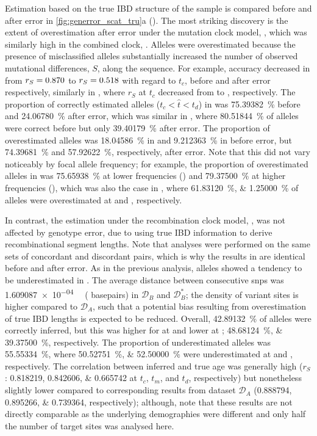 Estimation based on the true IBD structure of the sample is compared before and after error in \cref{fig:generror_scat_tru}{a} ().
The most striking discovery is the extent of overestimation after error under the mutation clock model, \ClockM, which was similarly high in the combined clock, \ClockC.
Alleles were overestimated because the presence of misclassified alleles substantially increased the number of observed mutational differences, $S$, along the sequence.
For example, accuracy decreased in \ClockM from ${r_S = \dec{0.869553}}$ to ${r_S = \dec{0.517705}}$ with regard to $t_c$, before and after error respectively, similarly in \ClockC, where $r_S$ at $t_c$ decreased from  to , respectively.
The proportion of correctly estimated alleles (${t_c < \hat{t} < t_d}$) in \ClockM was \SI{75.39382}{\percent} before and \SI{24.06780}{\percent} after error, which was similar in \ClockC, where \SI{80.51844}{\percent} of alleles were correct before but only \SI{39.40179}{\percent} after error.
The proportion of overestimated alleles was
\SI{18.04586}{\percent} in \ClockM and \SI{9.212363}{\percent} in \ClockC before error, but \SI{74.39681}{\percent} and \SI{57.92622}{\percent}, respectively, after error.
Note that this did not vary noticeably by focal allele frequency; for example, the proportion of overestimated alleles in \ClockM was \SI{75.65938}{\percent} at lower frequencies (\fk{[2,5]}) and \SI{79.37500}{\percent} at higher frequencies (\fk{[20,25]}), which was also the case in \ClockC, where \SIlist{61.83120;1.25000}{\percent} of alleles were overestimated at \fk{[2,5]} and \fk{[20,25]}, respectively.

In contrast, the estimation under the recombination clock model, \ClockR, was not affected by genotype error, due to using true IBD information to derive recombinational segment lengths.
Note that analyses were performed on the same sets of concordant and discordant pairs, which is why the results in \ClockR are identical before and after error.
As in the previous analysis, alleles showed a tendency to be underestimated in \ClockR.
The average distance between consecutive \glspl{snp} was \SI{1.609087e-04}{\centi\morgan} ( basepairs) in ${\mathcal{D}_B}$ and ${\mathcal{D}_B^{\ast}}$; \ie the density of variant sites is higher compared to ${\mathcal{D}_A}$, such that a potential bias resulting from overestimation of true IBD lengths is expected to be reduced.
Overall, \SI{42.89132}{\percent} of alleles were correctly inferred, but this was higher for at \fk{[2,5]} and lower at \fk{[20,25]}; \SIlist{48.68124;39.37500}{\percent}, respectively.
The proportion of underestimated alleles was \SI{55.55334}{\percent}, where \SIlist{50.52751;52.50000}{\percent} were underestimated at \fk{[2,5]} and \fk{[20,25]}, respectively.
The correlation between inferred and true age was generally high
($r_S$: \numlist{0.818219;0.842606;0.665742} at $t_c$, $t_m$, and $t_d$, respectively)
but nonetheless slightly lower compared to corresponding results from dataset ${\mathcal{D}_A}$
(\numlist{0.888794;0.895266;0.739364}, respectively); although, note that these results are not directly comparable as the underlying demographies were different and only half the number of target sites was analysed here.


